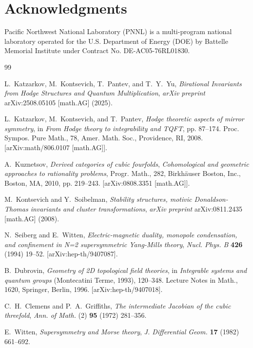 \documentclass[12pt,reqno]{amsart}
\theoremstyle{remark} \newtheorem{remark}[theorem]{Remark}
\begin{document}
\section*{Acknowledgments}
Pacific Northwest National Laboratory (PNNL) is a multi-program
national laboratory operated for the U.S.  Department of Energy (DOE)
by Battelle Memorial Institute under Contract No. DE-AC05-76RL01830.
\begin{thebibliography}{99}

   L.~Katzarkov, M.~Kontsevich, T.~Pantev, and
    T.~Y.~Yu, \emph{Birational Invariants from Hodge Structures and
    Quantum Multiplication}, \emph{arXiv preprint} arXiv:2508.05105
    [math.AG] (2025).

 L.~Katzarkov, M.~Kontsevich, and T.~Pantev,
  \emph{Hodge theoretic aspects of mirror symmetry}, in \emph{From
  Hodge theory to integrability and TQFT},
  pp. 87--174. Proc. Sympos. Pure Math., 78, Amer. Math. Soc.,
  Providence, RI, 2008.  [arXiv:math/806.0107 [math.AG]].

 A.~Kuznetsov, \emph{Derived categories of
cubic fourfolds}, \emph{Cohomological and geometric approaches to
rationality problems}, Progr. Math., 282, Birkh\"{a}user Boston, Inc.,
  Boston, MA, 2010, pp. 219--243.  [arXiv:0808.3351 [math.AG]].

 M.~Kontsevich and Y.~Soibelman,
  \emph{Stability structures, motivic Donaldson-Thomas invariants and
  cluster transformations}, \emph{arXiv preprint} arXiv:0811.2435
       [math.AG] (2008).

 N.~Seiberg and E.~Witten,
  \emph{Electric-magnetic duality, monopole condensation, and
  confinement in N=2 supersymmetric Yang-Mills theory},
  \emph{Nucl. Phys. B} \textbf{426} (1994) 19--52.
       [arXiv:hep-th/9407087].

 B.~Dubrovin, \emph{Geometry of 2D topological
field theories}, in \emph{Integrable systems and quantum groups}
  (Montecatini Terme, 1993), 120--348. Lecture Notes in Math., 1620,
  Springer, Berlin, 1996.  [arXiv:hep-th/9407018].

 C.~H.~Clemens and P.~A.~Griffiths, \emph{The
intermediate Jacobian of the cubic threefold}, \emph{Ann. of Math.}
  (2) \textbf{95} (1972) 281--356.

 E.~Witten, \emph{Supersymmetry and Morse theory},
  \emph{J. Differential Geom.} \textbf{17} (1982) 661--692.


\end{thebibliography}
\end{document}
